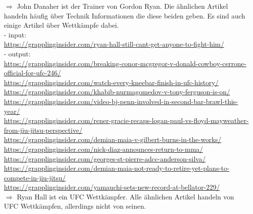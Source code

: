 \noindent$\Rightarrow$ John Danaher ist der Trainer von Gordon Ryan. Die ähnlichen Artikel handeln häufig über Technik Informationen die diese beiden geben. Es sind auch einige Artikel über Wettkämpfe dabei. \\

\noindent- input: \\
{\color{MidnightBlue}
\url{https://grapplinginsider.com/ryan-hall-still-cant-get-anyone-to-fight-him/}} \\
\noindent- output: \\
{\color{MidnightBlue}
\url{https://grapplinginsider.com/breaking-conor-mcgregor-v-donald-cowboy-cerrone-official-for-ufc-246/} \\
\url{https://grapplinginsider.com/watch-every-kneebar-finish-in-ufc-history/} \\
\url{https://grapplinginsider.com/khabib-nurmagomedov-v-tony-ferguson-is-on/} \\
\url{https://grapplinginsider.com/video-bj-penn-involved-in-second-bar-brawl-this-year/} \\
\url{https://grapplinginsider.com/rener-gracie-recaps-logan-paul-vs-floyd-mayweather-from-jiu-jitsu-perspective/} \\
\url{https://grapplinginsider.com/demian-maia-v-gilbert-burns-in-the-works/} \\
\url{https://grapplinginsider.com/nick-diaz-announces-return-to-mma/} \\
\url{https://grapplinginsider.com/georges-st-pierre-adcc-anderson-silva/} \\
\url{https://grapplinginsider.com/demian-maia-not-ready-to-retire-yet-plans-to-compete-in-jiu-jitsu/} \\
\url{https://grapplinginsider.com/yamauchi-sets-new-record-at-bellator-229/}} \\

\noindent$\Rightarrow$ Ryan Hall ist ein UFC Wettkämpfer. Alle ähnlichen Artikel handeln von UFC Wettkämpfen, allerdings nicht von seinen. \\

